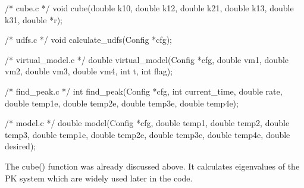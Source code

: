\documentclass[
  letterpaper,
  DIV=11,
  numbers=noendperiod]{scrartcl}
\newenvironment{Shaded}{\begin{snugshade}}{\end{snugshade}}
\newcommand{\CommentTok}[1]{\textcolor[rgb]{0.37,0.37,0.37}{#1}}
\newcommand{\DataTypeTok}[1]{\textcolor[rgb]{0.68,0.00,0.00}{#1}}
\newcommand{\NormalTok}[1]{\textcolor[rgb]{0.00,0.23,0.31}{#1}}
\newcommand{\OperatorTok}[1]{\textcolor[rgb]{0.37,0.37,0.37}{#1}}
\begin{document}
\begin{Shaded}
\begin{Highlighting}[]
\CommentTok{/* cube.c */}
\DataTypeTok{void}\NormalTok{ cube}\OperatorTok{(}\DataTypeTok{double}\NormalTok{ k10}\OperatorTok{,} \DataTypeTok{double}\NormalTok{ k12}\OperatorTok{,} \DataTypeTok{double}\NormalTok{ k21}\OperatorTok{,} \DataTypeTok{double}\NormalTok{ k13}\OperatorTok{,} \DataTypeTok{double}\NormalTok{ k31}\OperatorTok{,}
          \DataTypeTok{double} \OperatorTok{*}\NormalTok{r}\OperatorTok{);}

\CommentTok{/* udfs.c */}
\DataTypeTok{void}\NormalTok{ calculate\_udfs}\OperatorTok{(}\NormalTok{Config }\OperatorTok{*}\NormalTok{cfg}\OperatorTok{);}

\CommentTok{/* virtual\_model.c */}
\DataTypeTok{double}\NormalTok{ virtual\_model}\OperatorTok{(}\NormalTok{Config }\OperatorTok{*}\NormalTok{cfg}\OperatorTok{,} \DataTypeTok{double}\NormalTok{ vm1}\OperatorTok{,} \DataTypeTok{double}\NormalTok{ vm2}\OperatorTok{,} \DataTypeTok{double}\NormalTok{ vm3}\OperatorTok{,}
                     \DataTypeTok{double}\NormalTok{ vm4}\OperatorTok{,} \DataTypeTok{int}\NormalTok{ t}\OperatorTok{,} \DataTypeTok{int}\NormalTok{ flag}\OperatorTok{);}

\CommentTok{/* find\_peak.c */}
\DataTypeTok{int}\NormalTok{ find\_peak}\OperatorTok{(}\NormalTok{Config }\OperatorTok{*}\NormalTok{cfg}\OperatorTok{,} \DataTypeTok{int}\NormalTok{ current\_time}\OperatorTok{,} \DataTypeTok{double}\NormalTok{ rate}\OperatorTok{,} \DataTypeTok{double}\NormalTok{ temp1e}\OperatorTok{,}
              \DataTypeTok{double}\NormalTok{ temp2e}\OperatorTok{,} \DataTypeTok{double}\NormalTok{ temp3e}\OperatorTok{,} \DataTypeTok{double}\NormalTok{ temp4e}\OperatorTok{);}

\CommentTok{/* model.c */}
\DataTypeTok{double}\NormalTok{ model}\OperatorTok{(}\NormalTok{Config }\OperatorTok{*}\NormalTok{cfg}\OperatorTok{,} \DataTypeTok{double}\NormalTok{ temp1}\OperatorTok{,} \DataTypeTok{double}\NormalTok{ temp2}\OperatorTok{,} \DataTypeTok{double}\NormalTok{ temp3}\OperatorTok{,}
             \DataTypeTok{double}\NormalTok{ temp1e}\OperatorTok{,} \DataTypeTok{double}\NormalTok{ temp2e}\OperatorTok{,} \DataTypeTok{double}\NormalTok{ temp3e}\OperatorTok{,} \DataTypeTok{double}\NormalTok{ temp4e}\OperatorTok{,}
             \DataTypeTok{double}\NormalTok{ desired}\OperatorTok{);}
\end{Highlighting}
\end{Shaded}

The cube() function was already discussed above. It calculates
eigenvalues of the PK system which are widely used later in the code.
\end{document}

